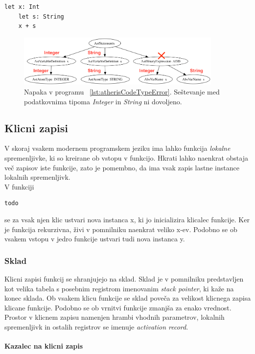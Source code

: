 \documentclass[a4paper, 12pt]{book}
\begin{document}
\begin{lstlisting}[caption={Primer programa, kjer je napaka v podatkovnih tipih},label={lst:atherisCodeTypeError},captionpos=b]
	let x: Int
	let s: String
	x + s
\end{lstlisting}

\begin{figure}[h]
	\begin{center}
		\includegraphics[width=0.9\textwidth]{resources/astSemanTypeError.png}
	\end{center}
	\caption{Napaka v programu ~\ref{lst:atherisCodeTypeError}. Seštevanje med podatkovnima tipoma \textit{Integer} in \textit{String} ni dovoljeno.}
	\label{image:astSemanTypeError}
\end{figure}

\subsection{Klicni zapisi}

V skoraj vsakem modernem programskem jeziku ima lahko funkcija \textit{lokalne} spremenljivke, ki so kreirane ob vstopu v funkcijo. Hkrati lahko naenkrat obstaja več zapisov iste funkcije, zato je pomembno, da ima vsak zapis lastne instance lokalnih spremenljivk. \cite{modernCompiler} \\
\indent V funkciji 
\begin{lstlisting}
todo
\end{lstlisting}

se za vsak njen klic ustvari nova instanca x, ki jo inicializira klicalec funkcije. Ker je funkcija rekurzivna, živi v pomnilniku naenkrat veliko x-ev. Podobno se ob vsakem vstopu v jedro funkcije ustvari tudi nova instanca y. \cite{modernCompiler}\\

\subsubsection{Sklad}

Klicni zapisi funkcij se shranjujejo na sklad. Sklad je v pomnilniku predstavljen kot velika tabela s posebnim registrom imenovanim \textit{stack pointer}, ki kaže na konec sklada. Ob vsakem klicu funkcije se sklad poveča za velikost klicnega zapisa klicane funkcije. Podobno se ob vrnitvi funkcije zmanjša za enako vrednost. Prostor v klicnem zapisu namenjen hrambi vhodnih parametrov, lokalnih spremenljivk in ostalih registrov se imenuje \textit{activation record}. \cite{modernCompiler}
\\\\
\textbf{Kazalec na klicni zapis}
\end{document}
